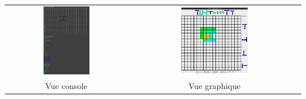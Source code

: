     \begin{table}[h]
        \centering
        \begin{tabular}{cc}
            \includegraphics[width=0.40\textwidth, keepaspectratio]{img/vueConsole.png} & \includegraphics[width=0.40\textwidth, keepaspectratio]{img/vueGraphique.png}\\
            Vue console & Vue graphique\\
        \end{tabular}
   \end{table}
